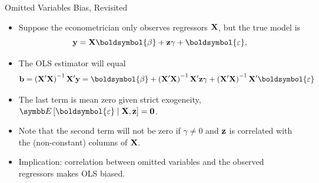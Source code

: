 \documentclass[aspectratio=169,11pt]{beamer}
\begin{document}


\begin{frame}{Omitted Variables Bias, Revisited}
\begin{itemize}
	\item Suppose the econometrician only observes regressors ${\bf X} $, but the true model is\[
			{\bf y}= {\bf X} \boldsymbol{\beta} + {\bf z} \gamma + \boldsymbol{\varepsilon},
	\]

	\item The OLS estimator will equal\[
	{\bf b} = \left({\bf X}'{\bf X}\right)^{-1} {\bf X}' {\bf y} = \boldsymbol{\beta}  + \left({\bf X}'{\bf X}\right)^{-1} {\bf X}' {\bf z} \gamma + \left({\bf X}'{\bf X}\right)^{-1} {\bf X}' \boldsymbol{\varepsilon}
	\]

	\item The last term is mean zero given strict exogeneity, $\E\left[\boldsymbol{\varepsilon} \mid {\bf X},{\bf z}\right]={\bf 0}$.

	\item Note that the second term will not be zero if $\gamma \ne 0$ and ${\bf z}$ is correlated
	with the (non-constant) columns of ${\bf X}$.

	\item Implication:  correlation between omitted variables and the observed regressors makes OLS biased.
\end{itemize}
\end{frame}
\end{document}
